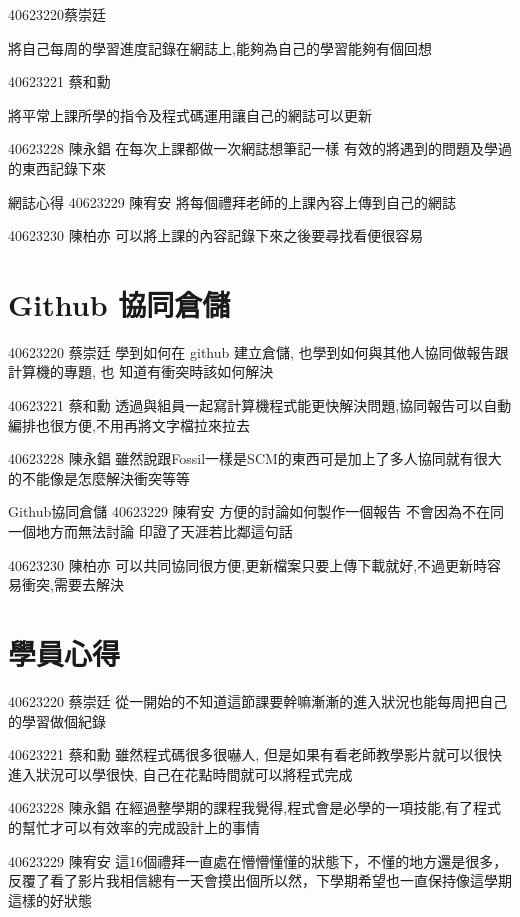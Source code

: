\documentclass[12pt,,]{report}
\begin{document}
40623220蔡崇廷

將自己每周的學習進度記錄在網誌上,能夠為自己的學習能夠有個回想

40623221 蔡和勳

將平常上課所學的指令及程式碼運用讓自己的網誌可以更新

40623228 陳永錩 在每次上課都做一次網誌想筆記一樣
有效的將遇到的問題及學過的東西記錄下來

網誌心得 40623229 陳宥安 將每個禮拜老師的上課內容上傳到自己的網誌

40623230 陳柏亦 可以將上課的內容記錄下來之後要尋找看便很容易

\hypertarget{github-ux5354ux540cux5009ux5132}{%
\section{Github 協同倉儲}\label{github-ux5354ux540cux5009ux5132}}

40623220 蔡崇廷 學到如何在 github 建立倉儲,
也學到如何與其他人協同做報告跟計算機的專題, 也 知道有衝突時該如何解決

40623221 蔡和勳
透過與組員一起寫計算機程式能更快解決問題,協同報告可以自動編排也很方便,不用再將文字檔拉來拉去

40623228 陳永錩
雖然說跟Fossil一樣是SCM的東西可是加上了多人協同就有很大的不能像是怎麼解決衝突等等

Github協同倉儲 40623229 陳宥安 方便的討論如何製作一個報告
不會因為不在同一個地方而無法討論 印證了天涯若比鄰這句話

40623230 陳柏亦
可以共同協同很方便,更新檔案只要上傳下載就好,不過更新時容易衝突,需要去解決

\hypertarget{ux5b78ux54e1ux5fc3ux5f97}{%
\section{學員心得}\label{ux5b78ux54e1ux5fc3ux5f97}}

40623220 蔡崇廷
從一開始的不知道這節課要幹嘛漸漸的進入狀況也能每周把自己的學習做個紀錄

40623221 蔡和勳 雖然程式碼很多很嚇人,
但是如果有看老師教學影片就可以很快進入狀況可以學很快,
自己在花點時間就可以將程式完成

40623228 陳永錩
在經過整學期的課程我覺得,程式會是必學的一項技能,有了程式的幫忙才可以有效率的完成設計上的事情

40623229 陳宥安
這16個禮拜一直處在懵懵懂懂的狀態下，不懂的地方還是很多，反覆了看了影片我相信總有一天會摸出個所以然，下學期希望也一直保持像這學期這樣的好狀態
\end{document}
